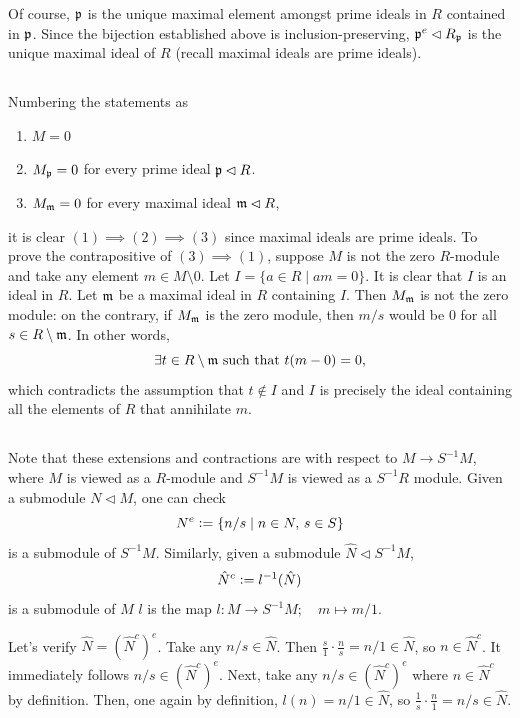 \documentclass[12pt]{article}
\begin{document}
Of course, $\mathfrak{p}$ is the unique maximal element amongst prime ideals in $R$ contained in $\mathfrak{p}$. 
Since the bijection established above is inclusion-preserving, $\mathfrak{p}^{e} \lhd R_{\mathfrak{p}}$ is the unique maximal ideal of $R$ (recall maximal ideals are prime ideals).  

\subsection{} 
Numbering the statements as 
\begin{enumerate} 
  \item $M = 0$ 
  \item $M_{\mathfrak{p}} = 0$ for every prime ideal $\mathfrak{p} \lhd R$. 
  \item $M_{\mathfrak{m}} = 0$ for every maximal ideal $\mathfrak{m} \lhd R$,
\end{enumerate} 
it is clear $(1) \implies (2) \implies (3)$ since maximal ideals are prime ideals. 
To prove the contrapositive of $(3) \implies (1)$, suppose $M$ is not the zero $R$-module and take any element $m \in M \setminus 0$. 
Let $I = \{a \in R \mid am = 0\}$. 
It is clear that $I$ is an ideal in $R$. 
Let $\mathfrak{m}$ be a maximal ideal in $R$ containing $I$. 
Then $M_{\mathfrak{m}}$ is not the zero module: 
on the contrary, if $M_{\mathfrak{m}}$ is the zero module, then $m / s$ would be 0 for all $s \in R \setminus \mathfrak{m}$. 
In other words, 
$$\exists t \in R \setminus \mathfrak{m} \text{ such that } t(m - 0) = 0,$$ 
which contradicts the assumption that $t \notin I$ and $I$ is precisely the ideal containing all the elements of $R$ that annihilate $m$. 

\setcounter{subsection}{13} 
\subsection{} 
Note that these extensions and contractions are with respect to $M \rightarrow S^{-1}M$, where $M$ is viewed as a $R$-module and $S^{-1}M$ is viewed as a $S^{-1}R$ module. 
Given a submodule $N \lhd M$, one can check 
$$N^{e} \vcentcolon= \{n / s \mid n \in N, \, s \in S\}$$ 
is a submodule of $S^{-1}M$. 
Similarly, given a submodule $\hat{N} \lhd S^{-1}M$, 
$$\hat{N}^{c} \vcentcolon= l^{-1}(\hat{N})$$
is a submodule of $M$ 
$l$ is the map $l: M \rightarrow S^{-1}M; \quad m \mapsto m/1$. 

Let's verify $\hat{N} = (\hat{N}^{c})^{e}$. 
Take any $n / s \in \hat{N}$. 
Then $\frac{s}{1} \cdot \frac{n}{s} = n / 1 \in \hat{N}$, so $n \in \hat{N}^{c}$. 
It immediately follows $n /s \in (\hat{N}^{c})^{e}$. 
Next, take any $n / s \in (\hat{N}^{c})^{e}$ where $n \in \hat{N}^{c}$ by definition. 
Then, one again by definition, $l(n) = n / 1 \in \hat{N}$, so $\frac{1}{s} \cdot \frac{n}{1} = n / s \in \hat{N}$. 
\end{document}
